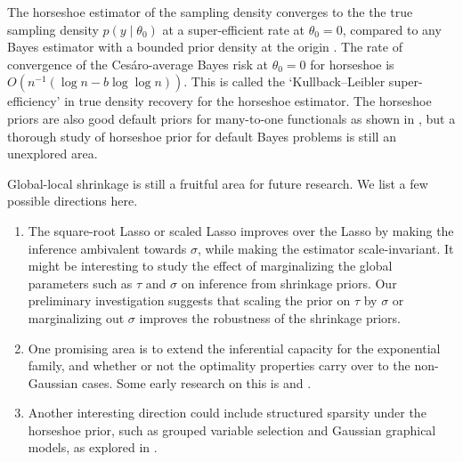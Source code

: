 \documentclass[sts,preprint]{imsart}
\begin{document}
The horseshoe estimator of the sampling density converges to the the true sampling density $p(y \mid \theta_0)$ at a super-efficient rate at $\theta_0 = 0$, compared to any Bayes estimator with a bounded prior density at the origin \citep[\textit{vide} Theorem 4]{carvalho2010horseshoe}. The rate of convergence of the Ces\'aro-average Bayes risk at $\theta_0 = 0$ for horseshoe is $O(n^{-1}(\log n - b \log \log n))$. This is called the `Kullback--Leibler super-efficiency' in true density recovery for the horseshoe estimator. The horseshoe priors are also good default priors for many-to-one functionals as shown in \citet{bhadra2015default}, but a thorough study of horseshoe prior for default Bayes problems is still an unexplored area. 

Global-local shrinkage is still a fruitful area for future research. %
We list a few possible directions here. 
\begin{enumerate}
   \item The square-root Lasso \citep{belloni2011square} or scaled Lasso \citep{sun2012scaled} improves over the Lasso by making the inference ambivalent towards $\sigma$, while making the estimator scale-invariant. It might be interesting to study the effect of marginalizing the global parameters such as $\tau$ and $\sigma$ on inference from shrinkage priors. Our preliminary investigation suggests that scaling the prior on $\tau$ by $\sigma$ or marginalizing out $\sigma$ improves the robustness of the shrinkage priors.
	\item One promising area is to extend the inferential capacity for the exponential family, and whether or not the optimality properties carry over to the non-Gaussian cases. Some early research on this is \citet{datta2016bayesian} and \citet{wei2017bayesian}. 
	\item Another interesting direction could include structured sparsity under the horseshoe prior, such as grouped variable selection and Gaussian graphical models, as explored in \cite{li2017graphical}. 
\end{enumerate}
\end{document}
